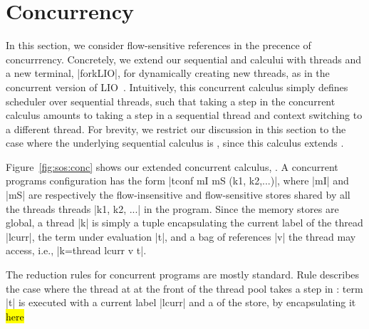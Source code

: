 \section{Concurrency}
\label{sec:conc}


In this section, we consider flow-sensitive references in the precence of
concurrrency.
%
Concretely, we extend our sequential \liofs{} and \lioafs{} calcului with
threads and a new terminal, |forkLIO|, for dynamically creating new threads, as
in the concurrent version of LIO~.
%
Intuitively, this concurrent calculus \lioconc{} simply defines scheduler over
sequential threads, such that taking a step in the concurrent calculus amounts
to taking a step in a sequential thread and context switching to a different
thread.
%
For brevity, we restrict our discussion in this section to the case where the
underlying sequential calculus is \lioafs{}, since this calculus extends
\liofs.

Figure~\ref{fig:sos:conc} shows our extended concurrent calculus, \lioconc{}.
%
A concurrent programs configuration has the form |tconf mI mS (k1, k2,...)|,
where |mI| and |mS| are respectively the flow-insensitive and flow-sensitive
stores shared by all the threads threads |k1, k2, ...| in the program.
%
Since the memory stores are global, a thread |k| is simply a tuple
encapsulating the current label of the thread |lcurr|, the term under
evaluation |t|, and a bag of references |v| the thread may access, i.e.,
|k=thread lcurr v t|.

The reduction rules for concurrent programs are mostly standard.
%
Rule  describes the case where the thread at at the front of
the thread pool takes a step in  \lioafs{}: term |t| is executed with a current
label |lcurr| and a of the store, by encapsulating it
\hl{here}


